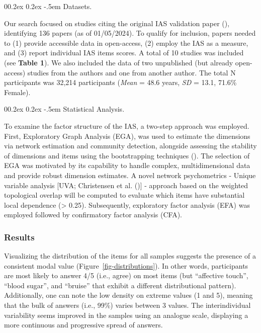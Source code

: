 \documentclass[
  man,
  floatsintext,
  longtable,
  nolmodern,
  notxfonts,
  notimes,
  colorlinks=true,linkcolor=blue,citecolor=blue,urlcolor=blue]{apa7}
\makeatletter
\renewcommand{\paragraph}{\@startsection{paragraph}{4}{\parindent}%
	{0\baselineskip \@plus 0.2ex \@minus 0.2ex}%
	{-.5em}%
	{\normalfont\normalsize\bfseries\typesectitle}}
\makeatother
\begin{document}
\paragraph{Datasets.}\label{datasets}

Our search focused on studies citing the original IAS validation paper
(), identifying 136 papers
(as of 01/05/2024). To qualify for inclusion, papers needed to (1)
provide accessible data in open-access, (2) employ the IAS as a measure,
and (3) report individual IAS items scores. A total of 10 studies was
included (see \textbf{Table 1}). We also included the data of two
unpublished (but already open-access) studies from the authors and one
from another author. The total N participants was 32,214 participants
(\emph{Mean} = 48.6 years, \emph{SD} = 13.1, 71.6\% Female).

\paragraph{Statistical Analysis.}\label{statistical-analysis}

To examine the factor structure of the IAS, a two-step approach was
employed. First, Exploratory Graph Analysis (EGA), was used to estimate
the dimensions via network estimation and community detection, alongside
assessing the stability of dimensions and items using the bootstrapping
techniques (). The selection of EGA was motivated by its capability to handle
complex, multidimensional data and provide robust dimension estimates. A
novel network psychometrics - Unique variable analysis {[}UVA;
Christensen et al. (){]} -
approach based on the weighted topological overlap will be computed to
evaluate which items have substantial local dependence (\textgreater{}
0.25). Subsequently, exploratory factor analysis (EFA) was employed
followed by confirmatory factor analysis (CFA).

\subsubsection{Results}\label{results}

Visualizing the distribution of the items for all samples suggests the
presence of a consistent modal value (Figure~\ref{fig-distributions}).
In other words, participants are most likely to answer 4/5 (i.e., agree)
on most items (but ``affective touch'', ``blood sugar'', and ``bruise''
that exhibit a different distributional pattern). Additionally, one can
note the low density on extreme values (1 and 5), meaning that the bulk
of answers (i.e., 99\%) varies between 3 values. The interindividual
variability seems improved in the samples using an analogue scale,
displaying a more continuous and progressive spread of answers.
\end{document}
